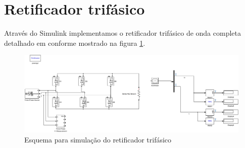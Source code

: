 \documentclass{report}
\begin{document}
{{\section{Retificador trifásico}
Através do Simulink implementamos o retificador trifásico de onda completa detalhado em \cite{bb:roteirosim1} conforme mostrado na figura \ref{fig:tsim}.
\begin{figure}[H]
	\centering
	\includegraphics[width=\linewidth]{matlab/tri_sim}
	\caption{Esquema para simulação do retificador trifásico}
	\label{fig:tsim}
\end{figure}

}}
\end{document}
